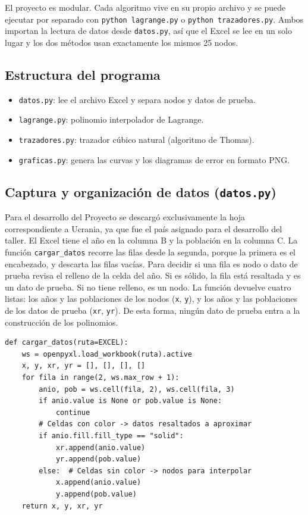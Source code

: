 \documentclass[11pt]{article}
\begin{document}
El proyecto es modular. Cada algoritmo vive en su propio archivo y se puede
ejecutar por separado con \texttt{python lagrange.py} o
\texttt{python trazadores.py}. Ambos importan la lectura de datos
desde \texttt{datos.py}, así que el Excel se lee en un solo lugar y los dos
métodos usan exactamente los mismos 25 nodos. 

\subsection{Estructura del programa}
\begin{itemize}
    \item \texttt{datos.py}: lee el archivo Excel y separa nodos y datos de prueba.
    \item \texttt{lagrange.py}: polinomio interpolador de Lagrange.
    \item \texttt{trazadores.py}: trazador cúbico natural (algoritmo de Thomas).
    \item \texttt{graficas.py}: genera las curvas y los diagramas de error en formato PNG.
\end{itemize}

\subsection{Captura y organización de datos (\texttt{datos.py})}
Para el desarrollo del Proyecto se descargó exclusivamente la hoja correspondiente a Ucrania, ya que fue el país asignado para el desarrollo del taller. El Excel tiene el año en la columna B y la población en la columna C. La función
\texttt{cargar\_datos} recorre las filas desde la segunda, porque la primera es el
encabezado, y descarta las filas vacías. Para decidir si una fila es nodo o dato de
prueba revisa el relleno de la celda del año. Si es sólido, la fila está resaltada
y es un dato de prueba. Si no tiene relleno, es un nodo. La función devuelve cuatro
listas: los años y las poblaciones de los nodos (\texttt{x}, \texttt{y}), y los
años y las poblaciones de los datos de prueba (\texttt{xr}, \texttt{yr}). De esta
forma, ningún dato de prueba entra a la construcción de los polinomios.

\begin{lstlisting}
def cargar_datos(ruta=EXCEL):
    ws = openpyxl.load_workbook(ruta).active
    x, y, xr, yr = [], [], [], []
    for fila in range(2, ws.max_row + 1):
        anio, pob = ws.cell(fila, 2), ws.cell(fila, 3)
        if anio.value is None or pob.value is None:
            continue
        # Celdas con color -> datos resaltados a aproximar
        if anio.fill.fill_type == "solid":
            xr.append(anio.value)
            yr.append(pob.value)
        else:  # Celdas sin color -> nodos para interpolar
            x.append(anio.value)
            y.append(pob.value)
    return x, y, xr, yr
\end{lstlisting}
\end{document}
